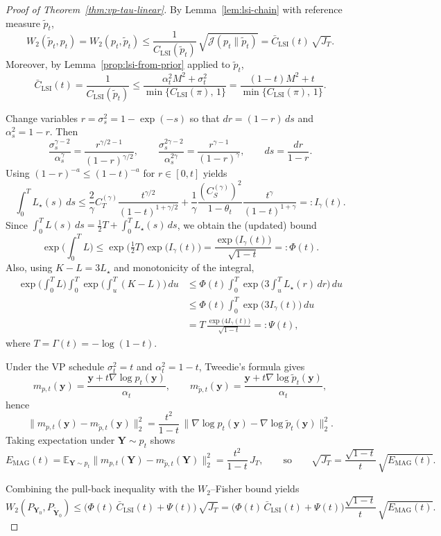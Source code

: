 \documentclass[12pt]{article}
\theoremstyle{definition} %
\providecommand{\E}{\mathbb{E}}
\begin{document}
\begin{proof}[Proof of Theorem~\ref{thm:vp-tau-linear}]
By Lemma~\ref{lem:lsi-chain} with reference measure $\tilde p_t$,
\[
W_2(\tilde p_t,p_t)=W_2(p_t,\tilde p_t)
\le \frac{1}{C_{\mathrm{LSI}}(\tilde p_t)}\,\sqrt{\mathcal{J}(p_t\|\tilde p_t)}
=\bar C_{\mathrm{LSI}}(t)\,\sqrt{J_T}.
\]
Moreover, by Lemma~\ref{prop:lsi-from-prior} applied to $\tilde p_t$,
\[
\bar C_{\mathrm{LSI}}(t)=\frac{1}{C_{\mathrm{LSI}}(\tilde p_t)}
\le \frac{\alpha_t^2 M^2+\sigma_t^2}{\min\{C_{\mathrm{LSI}}(\pi),\,1\}}
=\frac{(1-t)M^2+t}{\min\{C_{\mathrm{LSI}}(\pi),\,1\}}.
\]

Change variables $r=\sigma_s^2=1-\exp(-s)$ so that $dr=(1-r)\,ds$ and $\alpha_s^2=1-r$. Then
\[
\frac{\sigma_s^{\gamma-2}}{\alpha_s^{\gamma}}=\frac{r^{\gamma/2-1}}{(1-r)^{\gamma/2}},
\qquad
\frac{\sigma_s^{2\gamma-2}}{\alpha_s^{2\gamma}}=\frac{r^{\gamma-1}}{(1-r)^{\gamma}},
\qquad
ds=\frac{dr}{1-r}.
\]
Using $(1-r)^{-a}\le (1-t)^{-a}$ for $r\in[0,t]$ yields
\[
\int_0^T L_\star(s)\,ds
\le \frac{2}{\gamma}C_T^{(\gamma)}\frac{t^{\gamma/2}}{(1-t)^{1+\gamma/2}}
+\frac{1}{\gamma}\frac{(C_S^{(\gamma)})^2}{1-\theta_t}\frac{t^{\gamma}}{(1-t)^{1+\gamma}}
=: I_\gamma(t).
\]
Since $\int_0^T L(s)\,ds=\tfrac12 T+\int_0^T L_\star(s)\,ds$, we obtain the (updated) bound
\[
\exp\!\Big(\int_0^T L\Big)
\le \exp\!\Big(\tfrac12T\Big)\exp\!\big(I_\gamma(t)\big)
=\frac{\exp\!\big(I_\gamma(t)\big)}{\sqrt{1-t}}
=: \Phi(t).
\]
Also, using $K-L=3L_\star$ and monotonicity of the integral,
\begin{align*}
\exp\!\Big(\int_0^T L\Big)\int_0^T \exp\!\Big(\int_u^T (K-L)\Big)\,du
&\le \Phi(t)\int_0^T \exp\!\Big(3\int_u^T L_\star(r)\,dr\Big)\,du \\
&\le \Phi(t)\int_0^T \exp\!\big(3I_\gamma(t)\big)\,du \\
&= T\,\frac{\exp\!\big(4I_\gamma(t)\big)}{\sqrt{1-t}}
=: \Psi(t),
\end{align*}
where $T=\Gamma(t)=-\log(1-t)$.

Under the VP schedule $\sigma_t^2=t$ and $\alpha_t^2=1-t$, Tweedie's formula gives
\[
m_{p,t}(\bm y)=\frac{\bm y+t\nabla\log p_t(\bm y)}{\alpha_t},
\qquad
m_{\tilde p,t}(\bm y)=\frac{\bm y+t\nabla\log \tilde p_t(\bm y)}{\alpha_t},
\]
hence
\[
\|m_{p,t}(\bm y)-m_{\tilde p,t}(\bm y)\|_2^2=\frac{t^2}{1-t}\,
\|\nabla\log p_t(\bm y)-\nabla\log \tilde p_t(\bm y)\|_2^2.
\]
Taking expectation under $\bm Y\sim p_t$ shows
\[
E_{\mathrm{MAG}}(t)
=\E_{\bm Y\sim p_t}\|m_{p,t}(\bm Y)-m_{\tilde p,t}(\bm Y)\|_2^2
=\frac{t^2}{1-t}\,J_T,
\qquad\text{so}\qquad
\sqrt{J_T}=\frac{\sqrt{1-t}}{t}\,\sqrt{E_{\mathrm{MAG}}(t)}.
\]

Combining the pull-back inequality with the $W_2$--Fisher bound yields
\[
W_2(P_{\bm Y_0},P_{\tilde{\bm Y}_0})
\le \Big(\Phi(t)\,\bar C_{\mathrm{LSI}}(t)+\Psi(t)\Big)\,\sqrt{J_T}
=
\Big(\Phi(t)\,\bar C_{\mathrm{LSI}}(t)+\Psi(t)\Big)\frac{\sqrt{1-t}}{t}\,\sqrt{E_{\mathrm{MAG}}(t)}.
\]


\end{proof}
\end{document}
